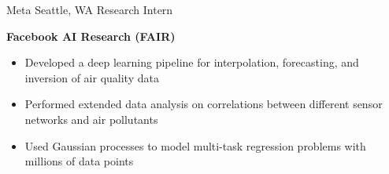 
        {Meta}
        {Seattle, WA}
        {Research Intern}
        {}{
    \textbf{Facebook AI Research (FAIR)}
    \begin{itemize}
        \item Developed a deep learning pipeline for interpolation, forecasting, and inversion of air quality data
        \item Performed extended data analysis on correlations between different sensor networks and air pollutants
        \item Used Gaussian processes to model multi-task regression problems with millions of data points
    \end{itemize}
}